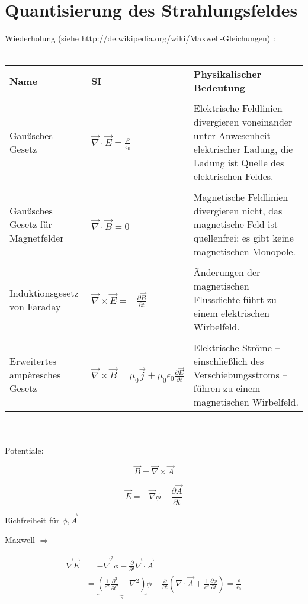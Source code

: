 


\tableofcontents
\setcounter{chapter}{6}
\chapter{Quantisierung des Strahlungsfeldes}

Wiederholung (siehe  http://de.wikipedia.org/wiki/Maxwell-Gleichungen) :\\
\\
\begin{tabular}{llp{7cm}}
  \textbf{Name}&\textbf{SI}&\textbf{Physikalischer Bedeutung}\\
\\
Gaußsches Gesetz & \( \vec \nabla\cdot\vec E = \frac{\rho}{\epsilon_0}  \)& Elektrische Feldlinien divergieren voneinander unter Anwesenheit elektrischer Ladung, die Ladung ist Quelle des elektrischen Feldes.\\
\\
Gaußsches Gesetz für Magnetfelder & \( \vec \nabla\cdot\vec B = 0  \) &Magnetische Feldlinien divergieren nicht, das magnetische Feld ist quellenfrei; es gibt keine magnetischen Monopole.\\
\\
Induktionsgesetz von Faraday& \(\vec\nabla\times\vec E = - \frac{\partial \vec B}{\partial t} \)&Änderungen der magnetischen Flussdichte führt zu einem elektrischen Wirbelfeld.\\
\\
Erweitertes ampèresches Gesetz& \( \vec\nabla\times\vec B = \mu_0\vec j + \mu_0\epsilon_0 \frac{\partial \vec E}{\partial t}  \)&Elektrische Ströme – einschließlich des Verschiebungsstroms – führen zu einem magnetischen Wirbelfeld.
\end{tabular}\\
\\
Potentiale:

\[\vec B = \vec \nabla \times \vec A\]

\[\vec E = -\vec \nabla \phi - \frac{\partial \vec A}{\partial t}\]

Eichfreiheit für \(\phi,\vec A\)

Maxwell \(\Rightarrow \)

\begin{align}
\vec \nabla \vec E &= - \vec \nabla^2\phi - \frac{\partial}{\partial t}\vec \nabla\cdot\vec A\\
&= \underbrace{(\frac{1}{c^2}\frac{\partial^2}{\partial t^2} - \nabla^2)}_{\square}\phi - \frac{\partial}{\partial t}(\nabla\cdot\vec A + \frac{1}{c^2}\frac{\partial\phi}{\partial t}) = \frac{\rho}{\epsilon_0}
\end{align}

